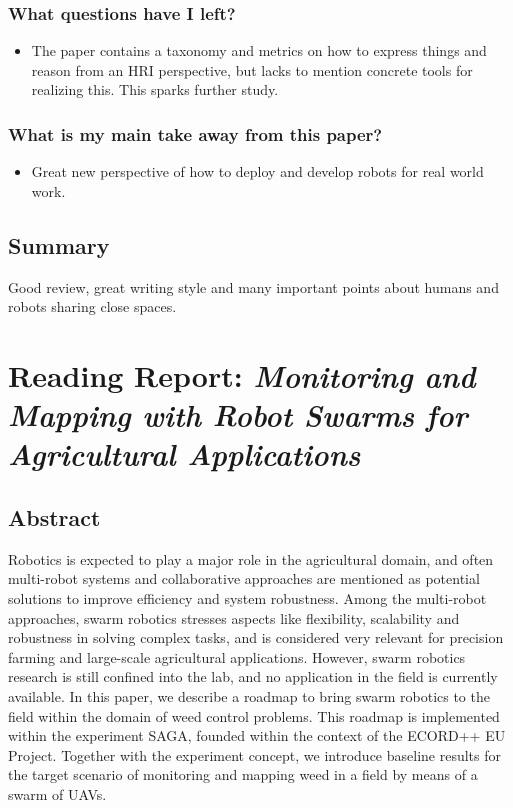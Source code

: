     \subsubsection*{What questions have I left?}
    \begin{itemize}
        \item The paper contains a taxonomy and metrics on how to express things and reason from an HRI perspective, but lacks to mention concrete tools for realizing this. This sparks further study.
    \end{itemize}
    \subsubsection*{What is my main take away from this paper?}
    \begin{itemize}
        \item Great new perspective of how to deploy and develop robots for real world work.
    \end{itemize}
    
    \subsection*{Summary}
    Good review, great writing style and many important points about humans and robots sharing close spaces. 
    

    
    
    \newpage
    \section{Reading Report: \emph{Monitoring and Mapping with Robot Swarms for Agricultural Applications}}
    \label{sec:Albani2017}
    \cite{Albani2017}
    
    \subsection*{Abstract}
    Robotics is expected to play a major role in the agricultural domain, and often multi-robot systems and collaborative approaches are mentioned as potential solutions
    to improve efficiency and system robustness. Among the
    multi-robot approaches, swarm robotics stresses aspects
    like flexibility, scalability and robustness in solving complex
    tasks, and is considered very relevant for precision farming
    and large-scale agricultural applications. However, swarm
    robotics research is still confined into the lab, and no application in the field is currently available. In this paper,
    we describe a roadmap to bring swarm robotics to the field
    within the domain of weed control problems. This roadmap
    is implemented within the experiment SAGA, founded within
    the context of the ECORD++ EU Project. Together with the
    experiment concept, we introduce baseline results for the
    target scenario of monitoring and mapping weed in a field
    by means of a swarm of UAVs.
    

